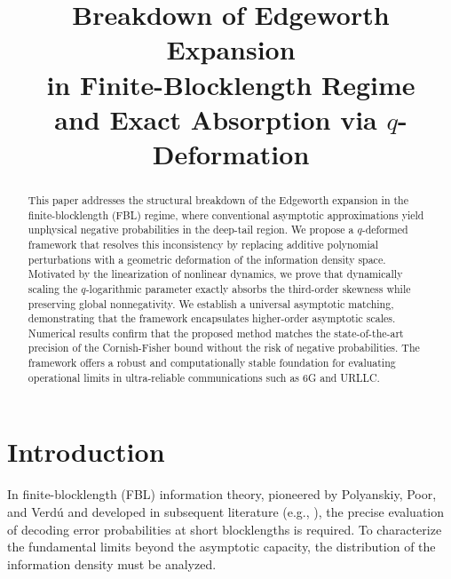 \documentclass[conference]{IEEEtran}
\begin{document}
\title{Breakdown of Edgeworth Expansion\\ in Finite-Blocklength Regime\\ and Exact Absorption via $q$-Deformation\\
}

\author{
}

\maketitle

\begin{abstract}
This paper addresses the structural breakdown of the Edgeworth expansion in the finite-blocklength (FBL) regime, where conventional asymptotic approximations yield unphysical negative probabilities in the deep-tail region. We propose a $q$-deformed framework that resolves this inconsistency by replacing additive polynomial perturbations with a geometric deformation of the information density space. Motivated by the linearization of nonlinear dynamics, we prove that dynamically scaling the $q$-logarithmic parameter exactly absorbs the third-order skewness while preserving global nonnegativity. We establish a universal asymptotic matching, demonstrating that the framework encapsulates higher-order asymptotic scales. Numerical results confirm that the proposed method matches the state-of-the-art precision of the Cornish-Fisher bound without the risk of negative probabilities. The framework offers a robust and computationally stable foundation for evaluating operational limits in ultra-reliable communications such as 6G and URLLC.
\end{abstract}

\section{Introduction}
\label{sec:introduction}

In finite-blocklength (FBL) information theory, pioneered by Polyanskiy, Poor, and Verdú \cite{Polyanskiy2010} and developed in subsequent literature (e.g., \cite{Tan2014}), the precise evaluation of decoding error probabilities at short blocklengths is required. To characterize the fundamental limits beyond the asymptotic capacity, the distribution of the information density must be analyzed.
\end{document}
